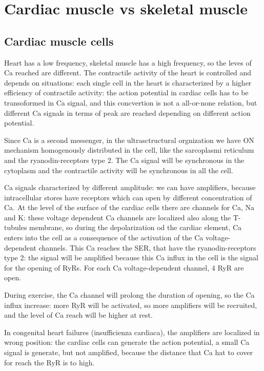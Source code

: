 \documentclass[a4paper, 12pt]{book}
\begin{document}
\chapter{Cardiac muscle vs skeletal muscle}
\section{Cardiac muscle cells}
Heart has a low frequency, skeletal muscle has a high frequency, so the leves of Ca reached are different. The contractile activity of the heart is controlled and depends on situations: each single cell in the heart is characterized by a higher efficiency of contractile activity: the action potential in cardiac cells has to be transoformed in Ca signal, and this concvertion is not a all-or-none relation, but different Ca signals in terms of peak are reached depending on different action potential. 

Since Ca is a second messenger, in the ultrasctructural orgnization we have ON mechanism homogenously distributed in the cell, like the sarcoplasmi reticulum and the ryanodin-receptors type 2. The Ca signal will be synchronous in the cytoplasm and the contractile activity will be synchronous in all the cell.

Ca signals characterized by different amplitude: we can have amplifiers, because intracellular stores have receptors which can open by different concentration of Ca. At the level of the surface of the cardiac cells there are channels for Ca, Na and K: these voltage dependent Ca channels are localized also along the T-tubules membrane, so during the depolarization od the cardiac element, Ca enters into the cell as a consequence of the activation of the Ca voltage-dependent channels. This Ca reaches the SER, that have the ryanodin-receptors type 2: the signal will be amplified because this Ca influx in the cell is the signal for the opening of RyRs. For each Ca voltage-dependent channel, 4 RyR are open. 

During exercise, the Ca channel will prolong the duration of opening, so the Ca influx increase: more RyR will be activated, so more amplifiers will be recruited, and the level of Ca reach will be higher at rest.


In congenital heart failures (insufficienza cardiaca), the amplifiers are localized in wrong position: the cardiac cells can generate the action potential, a small Ca signal is generate, but not amplified, because the distance that Ca hat to cover for reach the RyR is to high.
\end{document}
